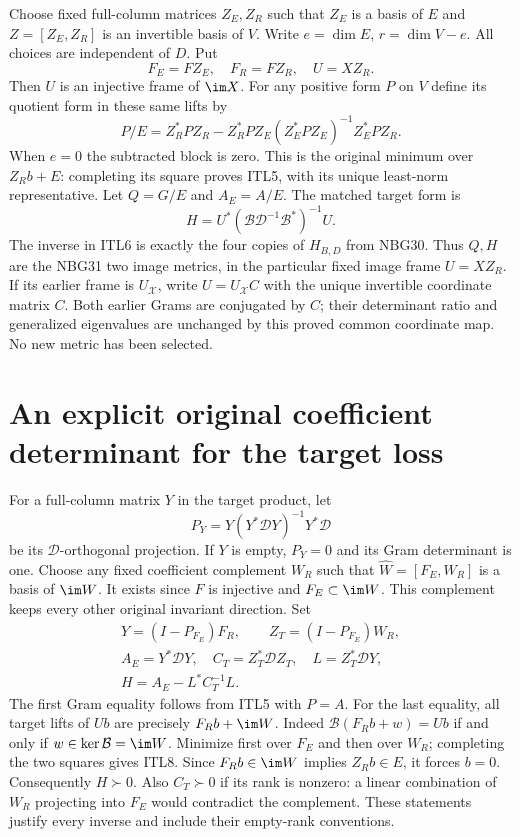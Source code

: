 \documentclass[11pt,a4paper]{article}
\begin{document}
Choose fixed full-column matrices $Z_E,Z_R$ such that
$Z_E$ is a basis of $E$ and $Z=[Z_E,Z_R]$ is an invertible
basis of $V$. Write $e=\dim E$, $r=\dim V-e$.
All choices are independent of $D$. Put
\[
 F_E=FZ_E,\quad F_R=FZ_R,\quad U=XZ_R .             \tag{ITL4}
\]
Then $U$ is an injective frame of $\im X$. For any positive form
$P$ on $V$ define its quotient form in these same lifts by
\[
 P/E=Z_R^*PZ_R-Z_R^*PZ_E(Z_E^*PZ_E)^{-1}Z_E^*PZ_R.
                                                        \tag{ITL5}
\]
When $e=0$ the subtracted block is zero. This is the original
minimum over $Z_Rb+E$: completing its square proves ITL5,
with its unique least-norm representative. Let $Q=G/E$ and
$A_E=A/E$. The matched target form is
\[
 H=U^*(\mathcal B\mathcal D^{-1}\mathcal B^*)^{-1}U .
                                                        \tag{ITL6}
\]
The inverse in ITL6 is exactly the four copies of $H_{B,D}$
from NBG30. Thus $Q,H$ are the NBG31 two image metrics, in
the particular fixed image frame $U=XZ_R$. If its earlier
frame is $U_{\mathcal X}$, write $U=U_{\mathcal X}C$ with
the unique invertible coordinate matrix $C$. Both earlier
Grams are conjugated by $C$; their determinant ratio and
generalized eigenvalues are unchanged by this proved common
coordinate map. No new metric has been selected.

\section{An explicit original coefficient determinant for the target loss}

For a full-column matrix $Y$ in the target product, let
\[
 P_Y=Y(Y^*\mathcal D Y)^{-1}Y^*\mathcal D             \tag{ITL7}
\]
be its $\mathcal D$-orthogonal projection. If $Y$ is empty,
$P_Y=0$ and its Gram determinant is one. Choose any fixed
coefficient complement $W_R$ such that
$\widehat W=[F_E,W_R]$ is a basis of $\im W$.
It exists since $F$ is injective and $F_E\subset\im W$.
This complement keeps every other original invariant direction.
Set
\[
 \begin{gathered}
 Y=(I-P_{F_E})F_R,\qquad Z_T=(I-P_{F_E})W_R,\\
 A_E=Y^*\mathcal D Y,\quad C_T=Z_T^*\mathcal D Z_T,\quad
 L=Z_T^*\mathcal D Y,\\
 H=A_E-L^*C_T^{-1}L .                              \end{gathered} \tag{ITL8}
\]
The first Gram equality follows from ITL5 with $P=A$.
For the last equality, all target lifts of $Ub$ are precisely
$F_Rb+\im W$. Indeed $\mathcal B(F_Rb+w)=Ub$ if and only
if $w\in\ker\mathcal B=\im W$. Minimize first over $F_E$
and then over $W_R$; completing the two squares gives ITL8.
Since $F_Rb\in\im W$ implies $Z_Rb\in E$, it forces $b=0$.
Consequently $H\succ0$. Also $C_T\succ0$ if its rank is
nonzero: a linear combination of $W_R$ projecting into $F_E$
would contradict the complement. These statements justify
every inverse and include their empty-rank conventions.
\end{document}
